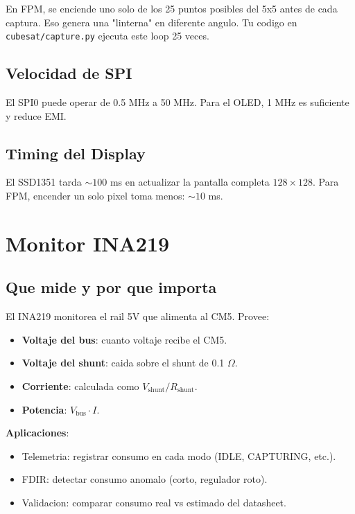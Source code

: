 \documentclass[11pt,a4paper,oneside,openright]{book}
\begin{document}
\begin{payload}
En FPM, se enciende uno solo de los 25 puntos posibles del 5x5 antes de
cada captura. Eso genera una "linterna" en diferente angulo. Tu codigo en
\texttt{cubesat/capture.py} ejecuta este loop 25 veces.
\end{payload}

\section{Velocidad de SPI}

El SPI0 puede operar de 0.5 MHz a 50 MHz. Para el OLED, 1 MHz es
suficiente y reduce EMI.

\section{Timing del Display}

El SSD1351 tarda $\sim 100$ ms en actualizar la pantalla completa
$128 \times 128$. Para FPM, encender un solo pixel toma menos: $\sim 10$ ms.

\chapter{Monitor INA219}
\label{ch:ina219}

\section{Que mide y por que importa}

El INA219 monitorea el rail 5V que alimenta al CM5. Provee:

\begin{itemize}[leftmargin=2em]
  \item \textbf{Voltaje del bus}: cuanto voltaje recibe el CM5.
  \item \textbf{Voltaje del shunt}: caida sobre el shunt de 0.1 $\Omega$.
  \item \textbf{Corriente}: calculada como $V_{\text{shunt}} / R_{\text{shunt}}$.
  \item \textbf{Potencia}: $V_{\text{bus}} \cdot I$.
\end{itemize}

\textbf{Aplicaciones}:

\begin{itemize}[leftmargin=2em]
  \item Telemetria: registrar consumo en cada modo (IDLE, CAPTURING, etc.).
  \item FDIR: detectar consumo anomalo (corto, regulador roto).
  \item Validacion: comparar consumo real vs estimado del datasheet.
\end{itemize}
\end{document}
